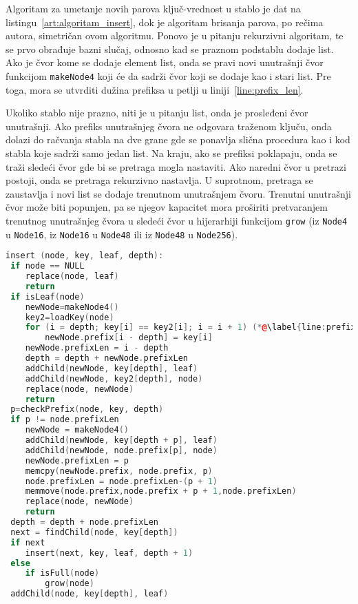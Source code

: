 \documentclass[12pt,oneside]{memoir}
\begin{document}
Algoritam za umetanje novih parova ključ-vrednost u stablo je dat
na listingu~\ref{art:algoritam_insert}, dok je algoritam brisanja
parova, po rečima autora, simetričan ovom algoritmu. Ponovo je u pitanju
rekurzivni algoritam, te se prvo obrađuje bazni slučaj, odnosno kad
se praznom podstablu dodaje list. Ako je čvor kome se dodaje
element list, onda se pravi novi unutrašnji čvor funkcijom
\texttt{makeNode4} koji će da sadrži čvor koji se dodaje
kao i stari list. Pre toga, mora se utvrditi dužina prefiksa
u petlji u liniji~\ref{line:prefix_len}.

Ukoliko stablo nije prazno, niti je u pitanju list, onda je
prosleđeni čvor unutrašnji. Ako prefiks unutrašnjeg
čvora ne odgovara traženom ključu, onda dolazi do račvanja
stabla na dve grane gde se ponavlja slična procedura
kao i kod stabla koje sadrži samo jedan list. Na kraju, ako se
prefiksi poklapaju, onda se traži sledeći čvor gde bi se
pretraga mogla nastaviti. Ako naredni čvor u pretrazi postoji,
onda se pretraga rekurzivno nastavlja. U suprotnom, pretraga se
zaustavlja i novi list se dodaje trenutnom unutrašnjem čvoru.
Trenutni unutrašnji čvor može biti popunjen, pa se njegov
kapacitet mora proširiti pretvaranjem trenutnog
unutrašnjeg čvora u sledeći čvor u hijerarhiji funkcijom
\texttt{grow} (iz \texttt{Node4}
u \texttt{Node16}, iz \texttt{Node16} u \texttt{Node48} ili
iz \texttt{Node48} u \texttt{Node256}).

\begin{lstlisting}[language=C++,
                   caption={Algoritam umetanja novih elemenata u stablo},
                   label={art:algoritam_insert}]
insert (node, key, leaf, depth):
 if node == NULL
    replace(node, leaf)
    return
 if isLeaf(node)
    newNode=makeNode4()
    key2=loadKey(node)
    for (i = depth; key[i] == key2[i]; i = i + 1) (*@\label{line:prefix_len}@*)
        newNode.prefix[i - depth] = key[i]
    newNode.prefixLen = i - depth
    depth = depth + newNode.prefixLen
    addChild(newNode, key[depth], leaf)
    addChild(newNode, key2[depth], node)
    replace(node, newNode)
    return
 p=checkPrefix(node, key, depth)
 if p != node.prefixLen
    newNode = makeNode4()
    addChild(newNode, key[depth + p], leaf)
    addChild(newNode, node.prefix[p], node)
    newNode.prefixLen = p
    memcpy(newNode.prefix, node.prefix, p)
    node.prefixLen = node.prefixLen-(p + 1)
    memmove(node.prefix,node.prefix + p + 1,node.prefixLen)
    replace(node, newNode)
    return
 depth = depth + node.prefixLen
 next = findChild(node, key[depth])
 if next
    insert(next, key, leaf, depth + 1)
 else
    if isFull(node)
        grow(node)
 addChild(node, key[depth], leaf)
\end{lstlisting}
\end{document}

